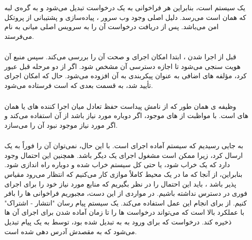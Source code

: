  یک سیستم  است، بنابراین هر فراخوانی  به یک درخواست  تبدیل می‌شود و به گره‌ی لبه که همان  است می‌رسد. دلیل اصلی وجود وب سرور ، پیاده‌سازی و پشتیبانی از پروتکل امن  می‌باشد.  پس از دریافت درخواست آن را به سرویس اصلی میانی به نام  می‌فرستد.

\subsubsection*{}

قبل از اجرا شدن ، ابتدا  امکان اجرای و صحت آن را بررسی می‌کند. سپس منبع آن هویت سنجی می‌شود تا اجازه دسترسی آن مشخص شود. اگر  از دو مرحله قبل عبور کرد، مؤلفه های اضافی به عنوان پیکربندی به آن افزوده می‌شود. حال که امکان اجرای  تأیید شد، به قسمت بعدی که  است فرستاده می‌شود.

\subsubsection*{}

وظیفه ی  همان طور که از نامش پیداست حفظ تعادل میان اجرا کننده های  یا همان  های  است.  با مواظبت از  های  موجود، اگر دوباره مورد نیاز باشد از آن استفاده می‌کند و اگر  مورد نیاز موجود نبود آن را می‌سازد.

\subsubsection*{}

به جایی رسیدیم که سیستم آماده اجرای  است. با این حال، نمی‌توان آن  را فوراً به یک  ارسال کرد، زیرا ممکن است مشغول اجرای یک  دیگر باشد. همچنین این احتمال وجود دارد که یک  خراب شود، یا حتی کل سیستم خراب شده و دوباره راه اندازی شود. بنابراین، از آنجا که ما در یک محیط کاملاً موازی کار می‌کنیم که انتظار می‌رود مقیاس پذیر باشد ، باید این احتمال را در نظر بگیریم که منابع مورد نیاز خود را برای اجرای فوری  در دسترس نداشته باشیم. در مواردی از این دست، مجبوریم فراخوانی ها را بافر کنیم.  از  برای انجام این عمل استفاده می‌کند.  یک سیستم پیام رسان "انتشار - اشتراک" با عملکرد بالا است که می‌تواند درخواست ها را تا زمان آماده شدن برای اجرای آن ها ذخیره کند. درخواست که برای ورود به  به  تبدیل شده بود، توسط  به یک پیام  تبدیل می‌شود که به  مقصدش آدرس دهی شده است.

